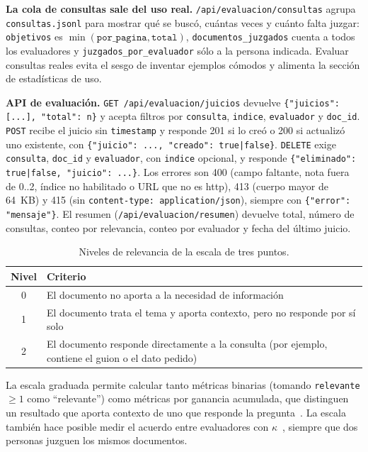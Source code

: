 \documentclass[11pt,spanish]{article}
\begin{document}
\textbf{La cola de consultas sale del uso real.} \texttt{/api/evaluacion/consultas}
agrupa \texttt{consultas.jsonl} para mostrar qué se buscó, cuántas veces y
cuánto falta juzgar: \texttt{objetivos} es
$\min(\texttt{por\_pagina},\texttt{total})$, \texttt{documentos\_juzgados}
cuenta a todos los evaluadores y \texttt{juzgados\_por\_evaluador} sólo a la
persona indicada. Evaluar consultas reales evita el sesgo de inventar ejemplos
cómodos y alimenta la sección de estadísticas de uso.

\textbf{API de evaluación.} \texttt{GET /api/evaluacion/juicios} devuelve
\texttt{\{"juicios": [...], "total": n\}} y acepta filtros por
\texttt{consulta}, \texttt{indice}, \texttt{evaluador} y \texttt{doc\_id}.
\texttt{POST} recibe el juicio sin \texttt{timestamp} y responde 201 si lo creó
o 200 si actualizó uno existente, con \texttt{\{"juicio": ..., "creado":
true|false\}}. \texttt{DELETE} exige \texttt{consulta}, \texttt{doc\_id} y
\texttt{evaluador}, con \texttt{indice} opcional, y responde
\texttt{\{"eliminado": true|false, "juicio": ...\}}. Los errores son 400 (campo
faltante, nota fuera de 0..2, índice no habilitado o URL que no es http), 413
(cuerpo mayor de 64~KB) y 415 (sin \texttt{content-type: application/json}),
siempre con \texttt{\{"error": "mensaje"\}}. El resumen
(\texttt{/api/evaluacion/resumen}) devuelve total, número de consultas, conteo
por relevancia, conteo por evaluador y fecha del último juicio.

\begin{table}[htbp]
  \centering
  \footnotesize
  \caption{Niveles de relevancia de la escala de tres puntos.}
  \label{tab:niveles}
  \begin{tabular*}{\linewidth}{@{\extracolsep{\fill}}cl@{}}
    \toprule
    \textbf{Nivel} & \textbf{Criterio} \\
    \midrule
    0 & El documento no aporta a la necesidad de información \\
    1 & El documento trata el tema y aporta contexto, pero no responde por sí solo \\
    2 & El documento responde directamente a la consulta (por ejemplo, contiene el guion o el dato pedido) \\
    \bottomrule
  \end{tabular*}
\end{table}

La escala graduada permite calcular tanto métricas binarias (tomando
\texttt{relevante $\geq 1$} como ``relevante'') como métricas por ganancia
acumulada, que distinguen un resultado que aporta contexto de uno que responde la
pregunta~\cite{jarvelin2002}. La escala también hace posible medir el acuerdo
entre evaluadores con $\kappa$~\cite{cohen1960,landis1977}, siempre que dos
personas juzguen los mismos documentos.
\end{document}
